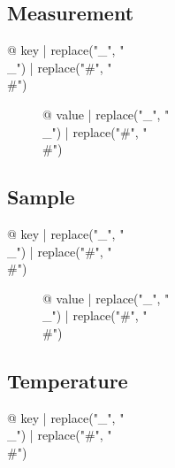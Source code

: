 \subsection{Measurement}

\begin{description}
\item[{@ key | replace("_", "\\_") | replace("#", "\\#") }] {@ value | replace("_", "\\_") | replace("#", "\\#") }
\end{description}

\subsection{Sample}

\begin{description}
\item[{@ key | replace("_", "\\_") | replace("#", "\\#") }] {@ value | replace("_", "\\_") | replace("#", "\\#") }
\end{description}

\subsection{Temperature}

\begin{description}
\item[{@ key | replace("_", "\\_") | replace("#", "\\#") }] %

\end{description}
